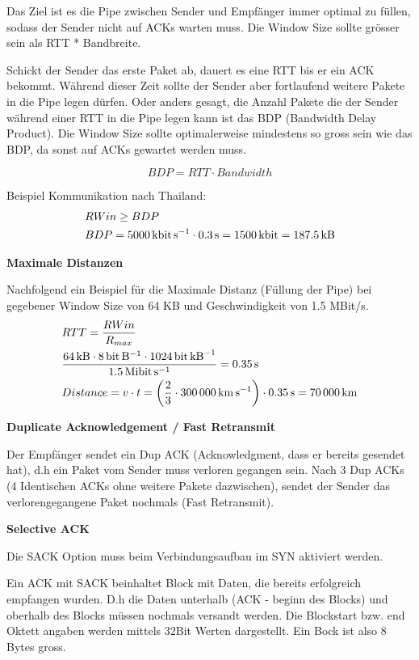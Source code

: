 Das Ziel ist es die Pipe zwischen Sender und Empfänger immer optimal zu füllen,
sodass der Sender nicht auf ACKs warten muss. Die Window Size sollte grösser
sein als RTT * Bandbreite.

Schickt der Sender das erste Paket ab, dauert es eine RTT bis er ein ACK
bekommt. Während dieser Zeit sollte der Sender aber fortlaufend weitere Pakete
in die Pipe legen dürfen. Oder anders gesagt, die Anzahl Pakete die der Sender
während einer RTT in die Pipe legen kann ist das BDP (Bandwidth Delay Product).
Die Window Size sollte optimalerweise mindestens so gross sein wie das BDP, da
sonst auf ACKs gewartet werden muss.

\[
	BDP=RTT \cdot Bandwidth
\]

Beispiel Kommunikation nach Thailand:
\begin{align*}
	& RWin \geq BDP \\
	& BDP = \SI{5000}{\kilo\bit\per\second} \cdot \SI{.3}{\second} = \SI{1500}{\kilo\bit} = \SI{187.5}{\kilo\byte}
\end{align*}

\textbf{Maximale Distanzen}

Nachfolgend ein Beispiel für die Maximale Distanz (Füllung der Pipe) bei
gegebener Window Size von 64 KB und Geschwindigkeit von 1.5 MBit/s.
\begin{align*}
	& RTT = \frac{RWin}{R_{max}} \\
	& \frac{\SI{64}{\kilo\byte} \cdot \SI{8}{\bit\per\byte} \cdot \SI{1024}{\bit\per\kilo\byte}}{\SI{1.5}{\mebi\bit\per\second}} = \SI{.35}{s} \\
	& Distance = v \cdot t =\left(\frac{2}{3} \cdot \SI{300000}{\kilo\meter\per\second}\right)\cdot \SI{.35}{s} = \SI{70000}{\kilo\meter}
\end{align*}

\textbf{Duplicate Acknowledgement / Fast Retransmit}

Der Empfänger sendet ein Dup ACK (Acknowledgment, dass er bereits gesendet hat),
d.h ein Paket vom Sender muss verloren gegangen sein. Nach 3 Dup ACKs (4
Identischen ACKs ohne weitere Pakete dazwischen), sendet der Sender das
verlorengegangene Paket nochmals (Fast Retransmit).

\textbf{Selective ACK}

Die SACK Option muss beim Verbindungsaufbau im SYN aktiviert werden. 

Ein ACK mit SACK beinhaltet Block mit Daten, die bereits erfolgreich empfangen
wurden. D.h die Daten unterhalb (ACK - beginn des Blocks) und oberhalb des
Blocks müssen nochmals versandt werden. Die Blockstart bzw. end Oktett angaben
werden mittels 32Bit Werten dargestellt. Ein Bock ist also 8 Bytes gross.

